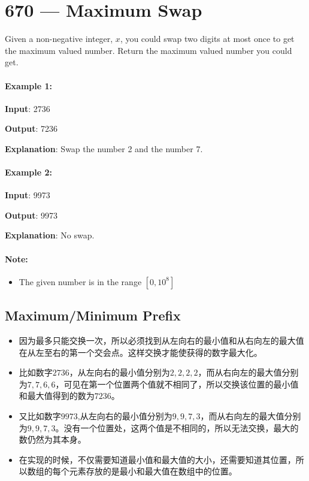 \section{670 --- Maximum Swap}
Given a non-negative integer, $x$, you could swap two digits at most once to get the maximum valued number. Return the maximum valued number you could get.

\paragraph{Example 1:}

\begin{flushleft}
\textbf{Input}: 2736

\textbf{Output}: 7236

\textbf{Explanation}: Swap the number 2 and the number 7.

\end{flushleft}

\paragraph{Example 2:}

\begin{flushleft}
\textbf{Input}: 9973

\textbf{Output}: 9973

\textbf{Explanation}: No swap.
\end{flushleft}

\paragraph{Note:}

\begin{itemize}
\item  The given number is in the range $[0, 10^8]$
\end{itemize}

\subsection{Maximum/Minimum Prefix}
\begin{itemize}
\item 因为最多只能交换一次，所以必须找到从左向右的最小值和从右向左的最大值在从左至右的第一个交会点。这样交换才能使获得的数字最大化。
\item 比如数字$2736$，从左向右的最小值分别为$2,2,2,2$，而从右向左的最大值分别为$7,7,6,6$，可见在第一个位置两个值就不相同了，所以交换该位置的最小值和最大值得到的数为$7236$。
\item 又比如数字$9973$,从左向右的最小值分别为$9,9,7,3$，而从右向左的最大值分别为$9,9,7,3$。没有一个位置处，这两个值是不相同的，所以无法交换，最大的数仍然为其本身。
\item 在实现的时候，不仅需要知道最小值和最大值的大小，还需要知道其位置，所以数组的每个元素存放的是最小和最大值在数组中的位置。
\end{itemize}